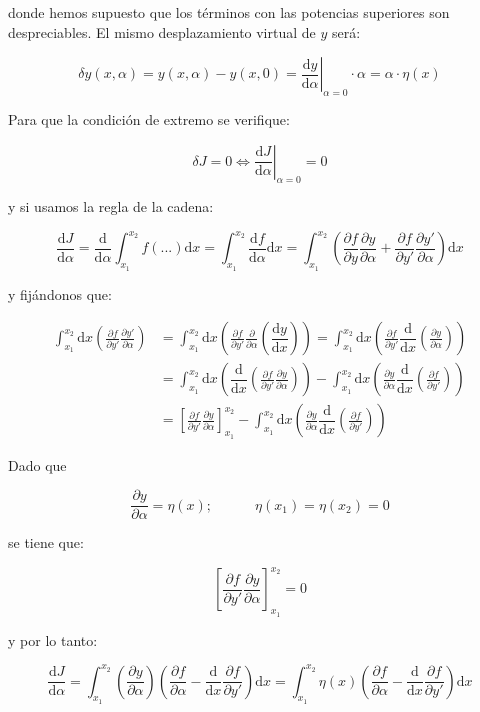 \documentclass[12pt,a4paper]{book}
\newcommand{\parentesis}[1]{\left( #1  \right)}
\newcommand{\parciales}[2]{\frac{\partial #1}{\partial #2}}
\newcommand{\ccorchetes}[1]{\left[ #1  \right]}
\newcommand{\D}{\mathrm{d}}
\newcommand{\tquad}{\quad \quad \quad}
\newcommand{\intx}{\int_{x_1}^{x_2}}
\begin{document}
donde hemos supuesto que los términos con las potencias superiores son despreciables. El mismo desplazamiento virtual de $y$ será:

\begin{equation}
\delta y(x,\alpha) = y(x,\alpha) - y(x,0) = \left. \dfrac{\D y}{\D \alpha} \right|_{\alpha = 0} \cdot \alpha = \alpha \cdot \eta (x)
\end{equation}

Para que la condición de extremo se verifique:

$$ \delta J = 0 \Leftrightarrow \left. \dfrac{\D J}{\D \alpha} \right|_{\alpha = 0} = 0 $$

y si usamos la regla de la cadena:

$$ \dfrac{\D J}{\D \alpha}= \dfrac{\D}{\D \alpha} \int_{x_1}^{x_2} f(...) \D x = \int_{x_1}^{x_2} \dfrac{\D f}{\D \alpha} \D x  = \int_{x_1}^{x_2} \parentesis{\parciales{f}{y}\parciales{y}{\alpha} + \parciales{f}{y'}\parciales{y'}{\alpha}} \D x $$

y fijándonos que:

\begin{align*}
\intx \D x \parentesis{\parciales{f}{y'}\parciales{y'}{\alpha}} & = \intx \D x \parentesis{\parciales{f}{y'} \parciales{}{\alpha} \parentesis{ \dfrac{\D y }{\D x} }} = \intx \D x \parentesis{\parciales{f}{y'} \dfrac{\D}{\D x} \parentesis{ \parciales{y }{\alpha} }} \\
     & = \intx \D x \parentesis{\dfrac{\D}{\D x} \parentesis{\parciales{f}{y'} \parciales{y}{\alpha}}} - \intx \D x \parentesis{\parciales{y}{\alpha} \dfrac{\D}{\D x} \parentesis{\parciales{f}{y'}}}   \\
     & =  \ccorchetes{\parciales{f}{y'} \parciales{y}{\alpha}}_{x_1}^{x_2} - \intx \D x \parentesis{\parciales{y}{\alpha} \dfrac{\D}{\D x} \parentesis{\parciales{f}{y'}}}
\end{align*}
 
Dado que 

$$ \parciales{y}{\alpha} = \eta (x); \tquad \eta(x_1)=\eta (x_2) = 0$$

se tiene que:

$$ \ccorchetes{\parciales{f}{y'} \parciales{y}{\alpha}}_{x_1}^{x_2} = 0 $$

y por lo tanto:

\begin{equation}
\dfrac{\D J}{\D \alpha} = \intx  \parentesis{\parciales{y}{\alpha}} \parentesis{\parciales{f}{\alpha}-\dfrac{\D}{\D x}\parciales{f}{y'}} \D x = \intx  \eta (x) \parentesis{\parciales{f}{\alpha}-\dfrac{\D}{\D x}\parciales{f}{y'}} \D x
\end{equation}
\end{document}
